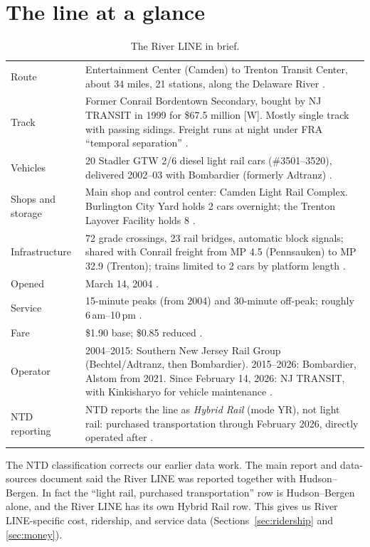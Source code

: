 \documentclass[11pt]{article}
\newcommand{\flag}[1]{\textcolor{sb}{\textsf{[#1]}}}
\begin{document}
\section{The line at a glance}
\begin{table}[ht]\centering\small
\begin{tabularx}{\textwidth}{@{}p{4.2cm}L@{}}
\toprule
Route & Entertainment Center (Camden) to Trenton Transit Center, about 34 miles, 21 stations, along the Delaware River \citep{njt_rline}. \\
Track & Former Conrail Bordentown Secondary, bought by NJ TRANSIT in 1999 for \$67.5 million \flag{W}. Mostly single track with passing sidings. Freight runs at night under FRA ``temporal separation'' \citep{fr1999waiver,fra2005horn}. \\
Vehicles & 20 Stadler GTW 2/6 diesel light rail cars (\#3501--3520), delivered 2002--03 with Bombardier (formerly Adtranz) \citep{pesky2025,nj_sso2021}. \\
Shops and storage & Main shop and control center: Camden Light Rail Complex. Burlington City Yard holds 2 cars overnight; the Trenton Layover Facility holds 8 \citep{nj_sso2021}. \\
Infrastructure & 72 grade crossings, 23 rail bridges, automatic block signals; shared with Conrail freight from MP 4.5 (Pennsauken) to MP 32.9 (Trenton); trains limited to 2 cars by platform length \citep{nj_sso2021}. \\
Opened & March 14, 2004 \citep{camdenhistory2004,njt_rline}. \\
Service & 15-minute peaks (from 2004) and 30-minute off-peak; roughly 6\,am--10\,pm \citep{njt2004fifteen,njt2003debut}. \\
Fare & \$1.90 base; \$0.85 reduced \citep{njt_fares}. \\
Operator & 2004--2015: Southern New Jersey Rail Group (Bechtel/Adtranz, then Bombardier). 2015--2026: Bombardier, Alstom from 2021. Since February 14, 2026: NJ TRANSIT, with Kinkisharyo for vehicle maintenance \citep{ols2027njt}. \\
NTD reporting & NTD reports the line as \emph{Hybrid Rail} (mode YR), not light rail: purchased transportation through February 2026, directly operated after \citep{ntd_monthly}. \\
\bottomrule
\end{tabularx}
\caption{The River LINE in brief.}
\end{table}

The NTD classification corrects our earlier data work. The main report and data-sources document said the River LINE was reported together with Hudson--Bergen. In fact the ``light rail, purchased transportation'' row is Hudson--Bergen alone, and the River LINE has its own Hybrid Rail row. This gives us River LINE-specific cost, ridership, and service data (Sections~\ref{sec:ridership} and \ref{sec:money}).
\end{document}
